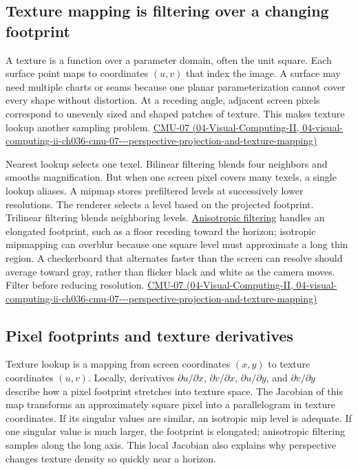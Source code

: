 \subsection{Texture mapping is filtering over a changing footprint}\label{03-visual-computing-i-ch004-texture-mapping-is-filtering-over-a-changing-footprint}

A texture is a function over a parameter domain, often the unit square. Each surface point maps to coordinates \((u,v)\) that index the image. A surface may need multiple charts or seams because one planar parameterization cannot cover every shape without distortion. At a receding angle, adjacent screen pixels correspond to unevenly sized and shaped patches of texture. This makes texture lookup another sampling problem. \href{../04-Visual-Computing-II/main.pdf\#nameddest=04-visual-computing-ii-ch036-cmu-07---perspective-projection-and-texture-mapping}{CMU-07 (04-Visual-Computing-II, 04-visual-computing-ii-ch036-cmu-07-\/-\/-perspective-projection-and-texture-mapping)}

Nearest lookup selects one texel. Bilinear filtering blends four neighbors and smooths magnification. But when one screen pixel covers many texels, a single lookup aliases. A mipmap stores prefiltered levels at successively lower resolutions. The renderer selects a level based on the projected footprint. Trilinear filtering blends neighboring levels. \hyperref[appendix-d5b3c692d9f0]{Anisotropic filtering} handles an elongated footprint, such as a floor receding toward the horizon; isotropic mipmapping can overblur because one square level must approximate a long thin region. A checkerboard that alternates faster than the screen can resolve should average toward gray, rather than flicker black and white as the camera moves. Filter before reducing resolution. \href{../04-Visual-Computing-II/main.pdf\#nameddest=04-visual-computing-ii-ch036-cmu-07---perspective-projection-and-texture-mapping}{CMU-07 (04-Visual-Computing-II, 04-visual-computing-ii-ch036-cmu-07-\/-\/-perspective-projection-and-texture-mapping)}

\subsection{Pixel footprints and texture derivatives}\label{03-visual-computing-i-ch004-pixel-footprints-and-texture-derivatives}

Texture lookup is a mapping from screen coordinates \((x,y)\) to texture coordinates \((u,v)\). Locally, derivatives \(\partial u/\partial x\), \(\partial v/\partial x\), \(\partial u/\partial y\), and \(\partial v/\partial y\) describe how a pixel footprint stretches into texture space. The Jacobian of this map transforms an approximately square pixel into a parallelogram in texture coordinates. If its singular values are similar, an isotropic mip level is adequate. If one singular value is much larger, the footprint is elongated; anisotropic filtering samples along the long axis. This local Jacobian also explains why perspective changes texture density so quickly near a horizon.

